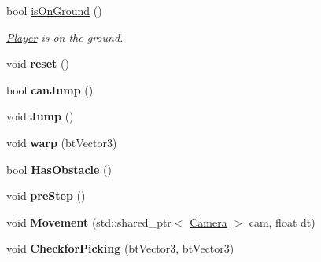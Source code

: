 \begin{DoxyCompactItemize}
bool \hyperlink{class_game_1_1_player_af6ac1597903155f7300f8aa01b774959}{is\+On\+Ground} ()
\begin{DoxyCompactList}\small\item\em \hyperlink{class_game_1_1_player}{Player} is on the ground. \end{DoxyCompactList}\item 
void {\bfseries reset} ()\hypertarget{class_game_1_1_player_a01c89e0e6aecd2a2a755def2b70c1386}{}\label{class_game_1_1_player_a01c89e0e6aecd2a2a755def2b70c1386}

\item 
bool {\bfseries can\+Jump} ()\hypertarget{class_game_1_1_player_acd3d5ea3d2c955b37ce97438bf4b441c}{}\label{class_game_1_1_player_acd3d5ea3d2c955b37ce97438bf4b441c}

\item 
void {\bfseries Jump} ()\hypertarget{class_game_1_1_player_a9087e2f119e35dcf0f08fd0b3c1d62fb}{}\label{class_game_1_1_player_a9087e2f119e35dcf0f08fd0b3c1d62fb}

\item 
void {\bfseries warp} (bt\+Vector3)\hypertarget{class_game_1_1_player_a35f23fc1670c2be92ef51a2052774046}{}\label{class_game_1_1_player_a35f23fc1670c2be92ef51a2052774046}

\item 
bool {\bfseries Has\+Obstacle} ()\hypertarget{class_game_1_1_player_ad9a1f1282311677ee3a800525fb23f5c}{}\label{class_game_1_1_player_ad9a1f1282311677ee3a800525fb23f5c}

\item 
void {\bfseries pre\+Step} ()\hypertarget{class_game_1_1_player_a7934f0f80dd63aa2ca154f117c82bc7c}{}\label{class_game_1_1_player_a7934f0f80dd63aa2ca154f117c82bc7c}

\item 
void {\bfseries Movement} (std\+::shared\+\_\+ptr$<$ \hyperlink{class_camera}{Camera} $>$ cam, float dt)\hypertarget{class_game_1_1_player_a7051c1ebe7cfd413b94636ccf0423215}{}\label{class_game_1_1_player_a7051c1ebe7cfd413b94636ccf0423215}

\item 
void {\bfseries Checkfor\+Picking} (bt\+Vector3, bt\+Vector3)\hypertarget{class_game_1_1_player_a5ed97a33ac3925dde9c32d9fd468174e}{}\label{class_game_1_1_player_a5ed97a33ac3925dde9c32d9fd468174e}

\end{DoxyCompactItemize}
